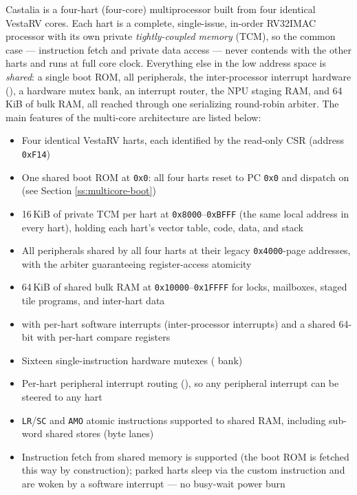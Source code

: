Castalia is a four-hart (four-core) multiprocessor built from four identical VestaRV cores. Each hart is a complete, single-issue, in-order RV32IMAC processor with its own private \textit{tightly-coupled memory} (TCM), so the common case --- instruction fetch and private data access --- never contends with the other harts and runs at full core clock. Everything else in the low address space is \textit{shared}: a single boot ROM, all peripherals, the inter-processor interrupt hardware (), a hardware mutex bank, an interrupt router, the NPU staging RAM, and 64\,KiB of bulk RAM, all reached through one serializing round-robin arbiter. The main features of the multi-core architecture are listed below:

\begin{itemize}
	\item Four identical VestaRV harts, each identified by the read-only  CSR (address \texttt{0xF14})
	\item One shared boot ROM at \texttt{0x0}: all four harts reset to PC \texttt{0x0} and dispatch on  (see Section \ref{ss:multicore-boot})
	\item 16\,KiB of private TCM per hart at \texttt{0x8000}--\texttt{0xBFFF} (the same local address in every hart), holding each hart's vector table, code, data, and stack
	\item All peripherals shared by all four harts at their legacy \texttt{0x4000}-page addresses, with the arbiter guaranteeing register-access atomicity
	\item 64\,KiB of shared bulk RAM at \texttt{0x10000}--\texttt{0x1FFFF} for locks, mailboxes, staged tile programs, and inter-hart data
	\item {} with per-hart software interrupts (inter-processor interrupts) and a shared 64-bit  with per-hart compare registers
	\item Sixteen single-instruction hardware mutexes ( bank)
	\item Per-hart peripheral interrupt routing (), so any peripheral interrupt can be steered to any hart
	\item \texttt{LR}/\texttt{SC} and \texttt{AMO} atomic instructions supported to shared RAM, including sub-word shared stores (byte lanes)
	\item Instruction fetch from shared memory is supported (the boot ROM is fetched this way by construction); parked harts sleep via the custom  instruction and are woken by a software interrupt --- no busy-wait power burn
\end{itemize}



